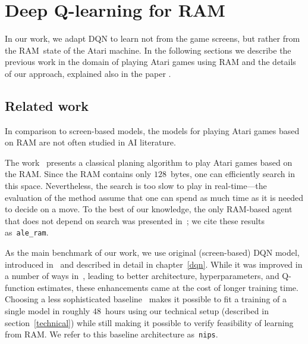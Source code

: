 \chapter{Deep Q-learning for RAM}\label{dqn-ram}
In our work, we adapt DQN to learn not from the game screens, but rather from the RAM~state of the Atari machine. In the following sections we describe the previous work in the domain of playing Atari games using RAM and the details of our approach, explained also in the paper \cite{our-paper}.

\section{Related work}
In comparison to screen-based models, the models for playing Atari games based on RAM are not often studied in AI literature.

The work~\cite{nir} presents a classical planing algorithm to play Atari games based on the RAM. Since the RAM contains only $128$~bytes, one can efficiently search in this space. Nevertheless, the search is too slow to play in real-time---the evaluation of the method assume that one can spend as much time as it is needed to decide on a move. To the best of our knowledge, the only RAM-based agent that does not depend on search was presented in~\cite{ale}; we cite these results as~\texttt{ale\_ram}.

As the main benchmark of our work, we use original (screen-based) DQN model, introduced in~\cite{nips-dqn} and described in detail in chapter~\ref{dqn}. While it was improved in a number of ways in~\cite{nature-dqn, double-dqn, shallow-dqn, duelling-dqn}, leading to better architecture, hyperparameters, and Q-function estimates, these enhancements came at the cost of longer training time. Choosing a less sophisticated baseline~\cite{nips-dqn} makes it possible to fit a training of a single model in roughly $48$~hours using our technical setup (described in section~\ref{technical}) while still making it possible to verify feasibility of learning from RAM. We refer to this baseline architecture as~\texttt{nips}.

